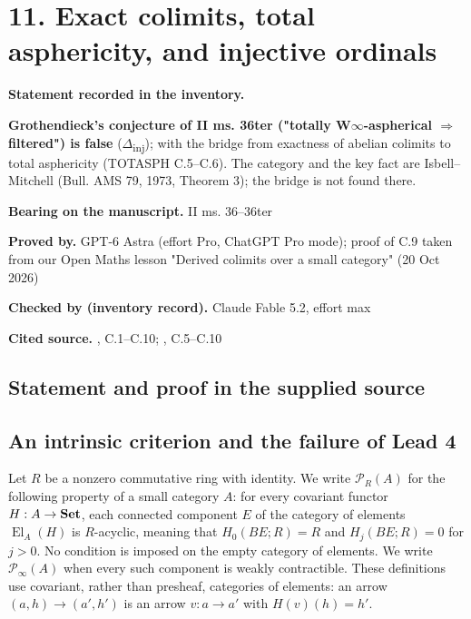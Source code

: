 \par\bigskip

\section*{11. Exact colimits, total asphericity, and injective ordinals}


\label{nr:entry11}

\noindent\textbf{Statement recorded in the inventory.}\par\smallskip

\textbf{Grothendieck's conjecture of II ms. 36ter ("totally W\ensuremath{\infty}-aspherical \ensuremath{\Rightarrow} filtered") is false} (\ensuremath{\Delta}\textsubscript{inj}); with the bridge from exactness of abelian colimits to total asphericity (TOTASPH C.5--C.6). The category and the key fact are Isbell--Mitchell (Bull. AMS 79, 1973, Theorem 3); the bridge is not found there.


\noindent\textbf{Bearing on the manuscript.} II ms. 36--36ter\par\smallskip

\noindent\textbf{Proved by.} GPT-6 Astra (effort Pro, ChatGPT Pro mode); proof of C.9 taken from our Open Maths lesson "Derived colimits over a small category" (20 Oct 2026)\par

\noindent\textbf{Checked by (inventory record).} Claude Fable 5.2, effort max\par\smallskip

\noindent\textbf{Cited source.} , C.1--C.10; , C.5--C.10\par\medskip

\subsection*{Statement and proof in the supplied source}

\subsection*{An intrinsic criterion and the failure of Lead 4}

\begin{nrdefinition}\label{NR:C:action-definition}
Let $R$ be a nonzero commutative ring with identity. We write $\mathcal P_R(A)$ for the following property of a small category $A$: for every covariant functor $H:A\to\mathbf{Set}$, each connected component $E$ of the category of elements $\operatorname{El}_A(H)$ is $R$-acyclic, meaning that $H_0(BE;R)=R$ and $H_j(BE;R)=0$ for $j>0$. No condition is imposed on the empty category of elements. We write $\mathcal P_\infty(A)$ when every such component is weakly contractible. These definitions use covariant, rather than presheaf, categories of elements: an arrow $(a,h)\to(a',h')$ is an arrow $v:a\to a'$ with $H(v)(h)=h'$.
\end{nrdefinition}


